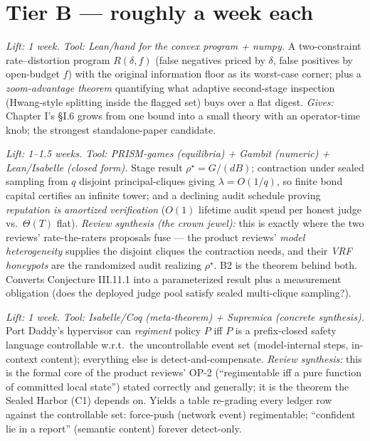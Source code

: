 \documentclass[11pt,a4paper]{article}
\begin{document}
\section{Tier B --- roughly a week each}
\begin{description}[leftmargin=0em,style=unboxed]
\item[B1. The digest--zoom Pareto frontier.] \emph{Lift: 1 week. Tool: Lean/hand for the convex program + numpy.} A two-constraint rate--distortion program $R(\delta,f)$ (false negatives priced by $\delta$, false positives by open-budget $f$) with the original information floor as its worst-case corner; plus a \emph{zoom-advantage theorem} quantifying what adaptive second-stage inspection (Hwang-style splitting inside the flagged set) buys over a flat digest. \emph{Gives:} Chapter I's \S I.6 grows from one bound into a small theory with an operator-time knob; the strongest standalone-paper candidate.

\item[B2. The inspection tower.] \emph{Lift: 1--1.5 weeks. Tool: PRISM-games (equilibria) + Gambit (numeric) + Lean/Isabelle (closed form).} Stage result $\rho^\star=G/(dB)$; contraction under sealed sampling from $q$ disjoint principal-cliques giving $\lambda=O(1/q)$, so finite bond capital certifies an infinite tower; and a declining audit schedule proving \emph{reputation is amortized verification} ($O(1)$ lifetime audit spend per honest judge vs.\ $\Theta(T)$ flat). \emph{Review synthesis (the crown jewel):} this is exactly where the two reviews' rate-the-raters proposals fuse --- the product reviews' \emph{model heterogeneity} supplies the disjoint cliques the contraction needs, and their \emph{VRF honeypots} are the randomized audit realizing $\rho^\star$. B2 is the theorem behind both. Converts Conjecture III.11.1 into a parameterized result plus a measurement obligation (does the deployed judge pool satisfy sealed multi-clique sampling?).

\item[B3. Hypervisor enforceability = Ramadge--Wonham controllability.] \emph{Lift: 1 week. Tool: Isabelle/Coq (meta-theorem) + Supremica (concrete synthesis).} Port Daddy's hypervisor can \emph{regiment} policy $P$ iff $P$ is a prefix-closed safety language controllable w.r.t.\ the uncontrollable event set (model-internal steps, in-context content); everything else is detect-and-compensate. \emph{Review synthesis:} this is the formal core of the product reviews' OP-2 (``regimentable iff a pure function of committed local state'') stated correctly and generally; it is the theorem the Sealed Harbor (C1) depends on. Yields a table re-grading every ledger row against the controllable set: force-push (network event) regimentable; ``confident lie in a report'' (semantic content) forever detect-only.


\end{description}
\end{document}
